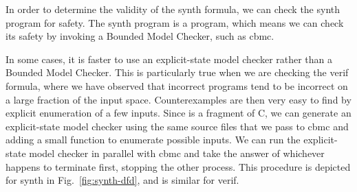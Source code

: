 

In order to determine the validity of the {\sc synth} formula, we can
check the {\sc synth} program for safety.  The {\sc synth} program is a
\newC program, which means we can check its safety by invoking a Bounded
Model Checker, such as {\sc cbmc}.

In some cases, it is faster to use an explicit-state model checker rather
than a Bounded Model Checker.  This is particularly true when we are checking
the {\sc verif} formula, where we have observed that incorrect programs tend
to be incorrect on a large fraction of the input space.  Counterexamples
are then very easy to find by explicit enumeration of a few inputs.
Since \newC is a fragment of C, we can generate an explicit-state
model checker using the same source files that we pass to {\sc cbmc}
and adding a small function to enumerate possible inputs.
We can run the explicit-state model checker
in parallel with {\sc cbmc} and take the answer of whichever happens
to terminate first, stopping the other process.  This procedure is
depicted for {\sc synth} in Fig.~\ref{fig:synth-dfd}, and is similar for {\sc verif}.

